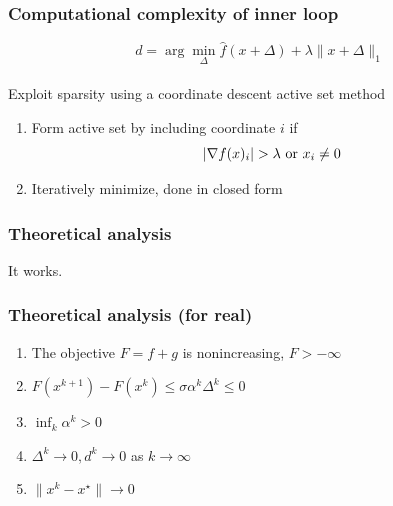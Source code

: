 \documentclass{beamer}
\begin{document}
\begin{frame}
\frametitle{Computational complexity of inner loop}
  \vspace{-0.4in}
  \[
  d = \arg \min_\Delta \hat{f}(x + \Delta) + \lambda\|x + \Delta \|_1
  \] \\
\pause
\vspace{0.3in}
Exploit sparsity using a coordinate descent active set method
\begin{enumerate}
\item Form active set by including coordinate $i$ if
\[
|\nabla f(x)_i| > \lambda \text{ or } x_i \ne 0
\vspace{-2mm}
\]
\item Iteratively minimize, done in closed
  form
\end{enumerate}
\end{frame}

\begin{frame}
\frametitle{Theoretical analysis}
\pause
\begin{center}
It works.
\end{center}
\end{frame}

\begin{frame}
\frametitle{Theoretical analysis (for real)}
\begin{enumerate}
\item The objective $F = f + g$ is nonincreasing, $F > -\infty$
\item $F(x^{k+1}) - F(x^k) \le \sigma \alpha^k\Delta^k \le 0$
\item $\inf_k \alpha^k > 0$
\item $\Delta^k \to 0, d^k \to 0$ as $k \to \infty$
\item $\|x^k  - x^\star\| \to 0$
\end{enumerate}
\end{frame}
\end{document}
